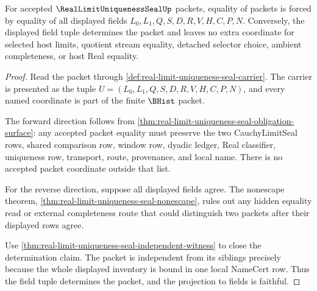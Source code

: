 \begin{theorem}
\label{thm:real-limit-uniqueness-seal-field-faithful-projection}
For accepted $\RealLimitUniquenessSealUp$ packets, equality of packets is forced by equality of all displayed fields $L_0,L_1,Q,S,D,R,V,H,C,P,N$. Conversely, the displayed field tuple determines the packet and leaves no extra coordinate for selected host limits, quotient stream equality, detached selector choice, ambient completeness, or host Real equality.
\end{theorem}
\begin{proof}
Read the packet through \autoref{def:real-limit-uniqueness-seal-carrier}. The carrier is presented as the tuple $U=(L_0,L_1,Q,S,D,R,V,H,C,P,N)$, and every named coordinate is part of the finite $\BHist$ packet.

The forward direction follows from \autoref{thm:real-limit-uniqueness-seal-obligation-surface}: any accepted packet equality must preserve the two CauchyLimitSeal rows, shared comparison row, window row, dyadic ledger, Real classifier, uniqueness row, transport, route, provenance, and local name. There is no accepted packet coordinate outside that list.

For the reverse direction, suppose all displayed fields agree. The nonescape theorem, \autoref{thm:real-limit-uniqueness-seal-nonescape}, rules out any hidden equality read or external completeness route that could distinguish two packets after their displayed rows agree.

Use \autoref{thm:real-limit-uniqueness-seal-independent-witness} to close the determination claim. The packet is independent from its siblings precisely because the whole displayed inventory is bound in one local NameCert row. Thus the field tuple determines the packet, and the projection to fields is faithful.
\end{proof}

